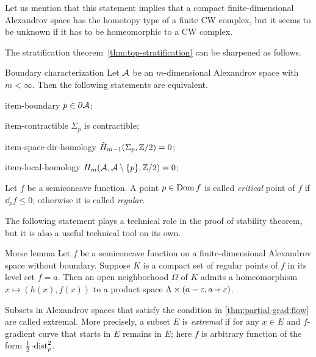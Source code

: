 Let us mention that this statement implies that a compact finite-dimensional Alexandrov space has the homotopy type of a finite CW complex,
but it seems to be unknown if it has to be homeomorphic to a CW complex.

The stratification theorem~\ref{thm:top-stratification} can be sharpened as follows.

\begin{thm}{Boundary characterization}
Let $\mathcal{A}$ be an $m$-dimensional Alexandrov space with $m<\infty$.
Then the following statements are equivalent.

\begin{subthm}{item-boundary} $p\in \partial \mathcal{A}$;
\end{subthm}

\begin{subthm}{item-contractible} $\Sigma_p$ is contractible;
\end{subthm}

\begin{subthm}{item-space-dir-homology} $\tilde H_{m-1}(\Sigma_p,\mathbb{Z}/2)= 0$;
\end{subthm}

\begin{subthm}{item-local-homology} $H_m(\mathcal{A},\mathcal{A}\setminus \{p\},\mathbb{Z}/2)= 0$;
\end{subthm}

\end{thm}

Let $f$ be a semiconcave function.
A point $p\in \mathop{\rm Dom}\nolimits f$ is called \emph{critical} point of $f$ if $\dd_pf\le 0$; 
otherwise it is called \emph{regular}.

The following statement plays a technical role in the proof of stability theorem,
but it is also a useful technical tool on its own.

\begin{thm}{Morse lemma}
Let $f$ be a semiconcave function on a finite-dimensional Alexandrov space without boundary.
Suppose $K$ is a compact set of regular points of $f$ in its level set $f=a$.
Then an open neighborhood $\Omega$ of $K$ admits a homeomorphism $x\mapsto (h(x),f(x))$ to a product space $\Lambda\times (a-\varepsilon,a+\varepsilon)$.
\end{thm}

Subsets in Alexandrov spaces that satisfy the condition in \ref{thm:partial-grad:flow} are called extremal.
More precisely, a subset $E$ is \emph{extremal} if for any $x\in E$
and $f$-gradient curve that starts in $E$ remains in $E$;
here $f$ is arbitrary function of the form $\tfrac12\cdot \distfun_p^2$. %

